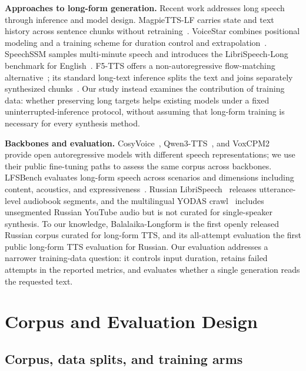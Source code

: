 \documentclass{article}
\newcommand{\corpus}{Balalaika-Longform}
\begin{document}
\noindent\textbf{Approaches to long-form generation.}
Recent work addresses long speech through inference and model design.
MagpieTTS-LF carries state and text history across sentence chunks without
retraining~\cite{ghosh2026magpiettslf}.  VoiceStar combines positional modeling and a
training scheme for duration control and extrapolation~\cite{peng2026voicestar}.
SpeechSSM samples multi-minute speech and introduces the LibriSpeech-Long
benchmark for English~\cite{park2025speechssm}.
F5-TTS offers a non-autoregressive flow-matching
alternative~\cite{chen2024f5tts}; its standard long-text inference splits the text
and joins separately synthesized chunks~\cite{chen2026f5code}.
Our study instead examines the contribution of training data: whether preserving
long targets helps existing models under a fixed uninterrupted-inference protocol,
without assuming that long-form training is necessary for every synthesis method.


\noindent\textbf{Backbones and evaluation.}
CosyVoice~\cite{du2024cosyvoice2,du2025cosyvoice3},
Qwen3-TTS~\cite{hu2026qwen3tts}, and VoxCPM2~\cite{zhou2026voxcpm2}
provide open autoregressive models with different speech representations; we use
their public fine-tuning paths to assess the same corpus across backbones.
LFSBench evaluates long-form speech across scenarios and dimensions including
content, acoustics, and expressiveness~\cite{pan2026lfsbench}.  Russian LibriSpeech~\cite{openslr96ruls} releases utterance-level audiobook
segments, and the multilingual YODAS crawl~\cite{li2023yodas} includes unsegmented
Russian YouTube audio but is not curated for single-speaker synthesis.  To our
knowledge, \corpus{} is the first openly released Russian corpus curated for
long-form TTS, and its all-attempt evaluation the first public long-form TTS
evaluation for Russian.
Our evaluation addresses a narrower training-data question: it controls input
duration, retains failed attempts in the reported metrics, and evaluates whether a
single generation reads the requested text.

\section{Corpus and Evaluation Design}
\label{sec:method}

\subsection{Corpus, data splits, and training arms}
\end{document}
